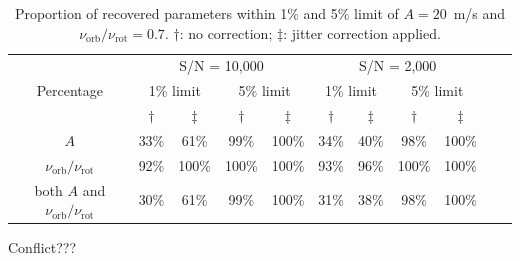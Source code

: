 \begin{table}[h!]
\centering
\begin{tabular}{|c|c|c|c|c|c|c|c|c|ll}
\cline{1-9}
\multirow{3}{*}{Percentage} & \multicolumn{4}{c|}{S/N = 10,000}                        & \multicolumn{4}{c|}{S/N = 2,000}                         &  &  \\ \cline{2-9}
                            & \multicolumn{2}{c|}{1\% limit} & \multicolumn{2}{c|}{5\% limit} & \multicolumn{2}{c|}{1\% limit} & \multicolumn{2}{c|}{5\% limit} &  &  \\ \cline{2-9}
                            				& $\dagger$     & $\ddagger$   & $\dagger$           & $\ddagger$           & $\dagger$           & $\ddagger$          & $\dagger$            & $\ddagger$          &  &  \\ \cline{1-9}
$A$                         					& 33\%            & 61\%           & 99\%            & 100\%            & 34\%            & 40\%           & 98\%             & 100\%           &  &  \\ \cline{1-9}
$\nu_\text{orb}/\nu_\text{rot}$              	& 92\%            & 100\%           & 100\%            & 100\%            & 93\%            & 96\%           & 100\%             & 100\%           &  &  \\ \cline{1-9}
both $A$ and $\nu_\text{orb}/\nu_\text{rot}$    & 30\%             & 61\%           & 99\%            & 100\%            & 31\%            & 38\%           & 98\%             & 100\%           &  &  \\ \cline{1-9}
\end{tabular}
\caption{Proportion of recovered parameters within 1\% and 5\% limit of $A = 20$~m/s and $\nu_\text{orb}/\nu_\text{rot} =0.7$. $\dagger$: no correction; $\ddagger$: jitter correction applied.}
\label{table:a=20}
\end{table}


Conflict???

\FloatBarrier

